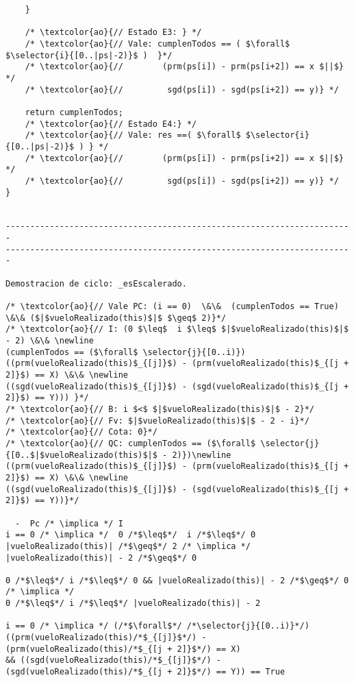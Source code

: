 \begin{lstlisting}
    }
    
    /* \textcolor{ao}{// Estado E3: } */
    /* \textcolor{ao}{// Vale: cumplenTodos == ( $\forall$ $\selector{i}{[0..|ps|-2)}$ )  }*/
    /* \textcolor{ao}{//        (prm(ps[i]) - prm(ps[i+2]) == x $||$} */
    /* \textcolor{ao}{//         sgd(ps[i]) - sgd(ps[i+2]) == y)} */
 
    return cumplenTodos;
    /* \textcolor{ao}{// Estado E4:} */
    /* \textcolor{ao}{// Vale: res ==( $\forall$ $\selector{i}{[0..|ps|-2)}$ ) } */    
    /* \textcolor{ao}{//        (prm(ps[i]) - prm(ps[i+2]) == x $||$} */
    /* \textcolor{ao}{//         sgd(ps[i]) - sgd(ps[i+2]) == y)} */
}


-----------------------------------------------------------------------
-----------------------------------------------------------------------

Demostracion de ciclo: _esEscalerado.

/* \textcolor{ao}{// Vale PC: (i == 0)  \&\&  (cumplenTodos == True) \&\& ($|$vueloRealizado(this)$|$ $\geq$ 2)}*/
/* \textcolor{ao}{// I: (0 $\leq$  i $\leq$ $|$vueloRealizado(this)$|$ - 2) \&\& \newline
(cumplenTodos == ($\forall$ \selector{j}{[0..i)}) ((prm(vueloRealizado(this)$_{[j]}$) - (prm(vueloRealizado(this)$_{[j + 2]}$) == X) \&\& \newline
((sgd(vueloRealizado(this)$_{[j]}$) - (sgd(vueloRealizado(this)$_{[j + 2]}$) == Y))) }*/
/* \textcolor{ao}{// B: i $<$ $|$vueloRealizado(this)$|$ - 2}*/
/* \textcolor{ao}{// Fv: $|$vueloRealizado(this)$|$ - 2 - i}*/
/* \textcolor{ao}{// Cota: 0}*/
/* \textcolor{ao}{// QC: cumplenTodos == ($\forall$ \selector{j}{[0..$|$vueloRealizado(this)$|$ - 2)})\newline
((prm(vueloRealizado(this)$_{[j]}$) - (prm(vueloRealizado(this)$_{[j + 2]}$) == X) \&\& \newline
((sgd(vueloRealizado(this)$_{[j]}$) - (sgd(vueloRealizado(this)$_{[j + 2]}$) == Y))}*/    

  -  Pc /* \implica */ I
i == 0 /* \implica */  0 /*$\leq$*/  i /*$\leq$*/ 0
|vueloRealizado(this)| /*$\geq$*/ 2 /* \implica */ |vueloRealizado(this)| - 2 /*$\geq$*/ 0

0 /*$\leq$*/ i /*$\leq$*/ 0 && |vueloRealizado(this)| - 2 /*$\geq$*/ 0 /* \implica */
0 /*$\leq$*/ i /*$\leq$*/ |vueloRealizado(this)| - 2 

i == 0 /* \implica */ (/*$\forall$*/ /*\selector{j}{[0..i)}*/) ((prm(vueloRealizado(this)/*$_{[j]}$*/) - (prm(vueloRealizado(this)/*$_{[j + 2]}$*/) == X) 
&& ((sgd(vueloRealizado(this)/*$_{[j]}$*/) - (sgd(vueloRealizado(this)/*$_{[j + 2]}$*/) == Y)) == True


\end{lstlisting}
